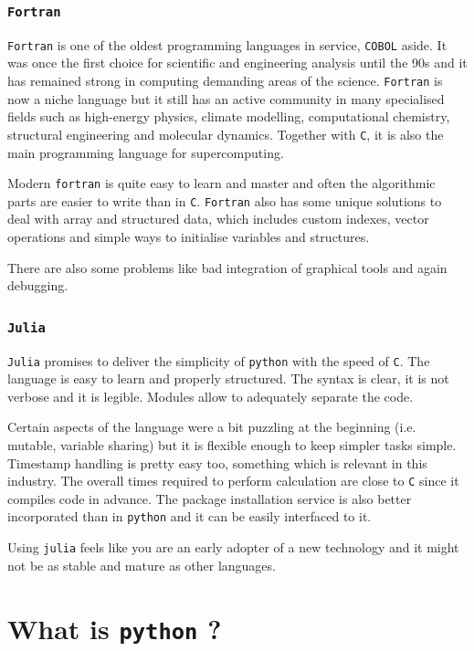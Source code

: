 \subsubsection{\texttt{Fortran}}
\texttt{Fortran} is one of the oldest programming languages in service, \texttt{COBOL} aside. It was once the first choice for scientific and engineering analysis until the 90s and it has remained strong in computing demanding areas of the science.
\texttt{Fortran} is now a niche language but it still has an active community in many specialised fields such as high-energy physics, climate modelling, computational chemistry, structural engineering and molecular dynamics. Together with \texttt{C}, it is also the main programming language for supercomputing. 

Modern \texttt{fortran} is quite easy to learn and master and often the algorithmic parts are easier to write than in \texttt{C}. \texttt{Fortran} also has some unique solutions to deal with array and structured data, which includes custom indexes, vector operations and simple ways to initialise variables and structures.

There are also some problems like bad integration of graphical tools and again debugging.  

\subsubsection{\texttt{Julia}}
\texttt{Julia} promises to deliver the simplicity of \texttt{python} with the speed of \texttt{C}.
The language is easy to learn and properly structured. The syntax is clear, it is not verbose and it is legible. Modules allow to adequately separate the code.

Certain aspects of the language were a bit puzzling at the beginning (i.e. mutable, variable sharing) but it is flexible enough to keep simpler tasks simple. Timestamp handling is pretty easy too, something which is relevant in this industry.
The overall times required to perform calculation are close to \texttt{C} since it compiles code in advance. The package installation service is also better incorporated than in \texttt{python} and it can be easily interfaced to it.

Using \texttt{julia} feels like you are an early adopter of a new technology and it might not be as stable and mature as other languages.

\section{What is \texttt{python} ?}
\label{what-is-python}

